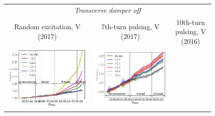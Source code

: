 \documentclass[
prstab
,reprint
,linenumbers
,longbibliography
,preprintnumbers
,showkeys
,amsfonts,amssymb,amsmath
,floatfix
]{revtex4-1}
\newcommand{\seventhtp}{7th-turn pulsing}
\newcommand{\tenthtp}{10th-turn pulsing}
\newlength{\thirdwidth}
\begin{document}
\begin{figure}
  \begin{tabular}{ccc}
    \multicolumn{3}{c}{\emph{Transverse damper off}} \\
    Random excitation, V (2017) & \seventhtp, V (2017) & \tenthtp, V
                                                         (2016) \\
    \includegraphics[width=\thirdwidth]{2017_emitv_avg_rel_vran_no_damper.png}&
    \includegraphics[width=\thirdwidth]{2017_emitv_avg_rel_v7th_no_damper_no_text.png} &

\end{tabular}
\end{figure}
\end{document}

